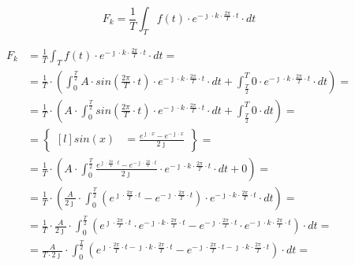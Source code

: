 \begin{task}

\begin{equation}
F_k=\frac{1}{T}\int_{T}f(t) \cdot e^{-\jmath \cdot k \cdot \frac{2\pi}{T} \cdot t} \cdot dt
\end{equation}


\begin{align*}
F_k&=\frac{1}{T}\int_{T}f(t) \cdot e^{-\jmath \cdot k \cdot \frac{2\pi}{T} \cdot t} \cdot dt=\\
&=\frac{1}{T}\cdot\left(\int_{0}^{\frac{T}{2}}A \cdot sin\left( \frac{2\pi}{T} \cdot t\right) \cdot e^{-\jmath \cdot k \cdot \frac{2\pi}{T} \cdot t} \cdot dt+\int_{\frac{T}{2}}^{T} 0 \cdot e^{-\jmath \cdot k \cdot \frac{2\pi}{T} \cdot t} \cdot dt\right)=\\
&=\frac{1}{T}\cdot\left(A \cdot \int_{0}^{\frac{T}{2}}sin\left( \frac{2\pi}{T} \cdot t\right) \cdot e^{-\jmath \cdot k \cdot \frac{2\pi}{T} \cdot t} \cdot dt+\int_{\frac{T}{2}}^{T} 0 \cdot dt\right)=\\
&=\begin{Bmatrix*}[l]
sin\left(x\right)&=\frac{e^{\jmath \cdot x}-e^{-\jmath \cdot x}}{2 \jmath }
\end{Bmatrix*}=\\
&=\frac{1}{T}\cdot\left(A \cdot \int_{0}^{\frac{T}{2}} \frac{e^{\jmath \cdot \frac{2\pi}{T} \cdot t}-e^{-\jmath \cdot \frac{2\pi}{T} \cdot t}}{2\jmath} \cdot e^{-\jmath \cdot k \cdot \frac{2\pi}{T} \cdot t} \cdot dt+0\right)=\\
&=\frac{1}{T}\cdot\left(\frac{A}{2\jmath} \cdot \int_{0}^{\frac{T}{2}} \left(e^{\jmath \cdot \frac{2\pi}{T} \cdot t}-e^{-\jmath \cdot \frac{2\pi}{T} \cdot t}\right)\cdot e^{-\jmath \cdot k \cdot \frac{2\pi}{T} \cdot t} \cdot dt\right)=\\
&=\frac{1}{T} \cdot \frac{A}{2\jmath} \cdot \int_{0}^{\frac{T}{2}}
\left( e^{\jmath \cdot \frac{2\pi}{T} \cdot t} \cdot e^{-\jmath \cdot k \cdot \frac{2\pi}{T} \cdot t} - e^{-\jmath \cdot \frac{2\pi}{T} \cdot t} \cdot e^{-\jmath \cdot k \cdot \frac{2\pi}{T} \cdot t} \right) \cdot dt=\\
&=\frac{A}{T\cdot 2\jmath} \cdot \int_{0}^{\frac{T}{2}}
\left(e^{\jmath \cdot \frac{2\pi}{T} \cdot t -\jmath \cdot k \cdot \frac{2\pi}{T} \cdot t} - e^{-\jmath \cdot \frac{2\pi}{T} \cdot t -\jmath \cdot k \cdot \frac{2\pi}{T} \cdot t} \right) \cdot dt=\\

\end{align*}
\end{task}
